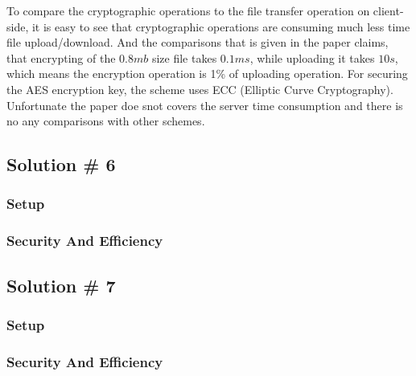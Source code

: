 \documentclass[12pt]{article}
\begin{document}
To compare the cryptographic operations to the file transfer operation on client-side, it is easy to see that cryptographic operations are consuming much less time file upload/download. And the comparisons that is given in the paper \cite{CovergentEnc} claims, that encrypting of the  $0.8 mb$  size file takes $0.1ms$, while uploading it takes $10s$, which means the encryption operation is 1\% of uploading operation. For securing the AES encryption key, the scheme uses ECC (Elliptic Curve Cryptography).\cite{ECC}  Unfortunate the paper\cite{CovergentEnc} doe snot covers the server time consumption and there is no any comparisons with other schemes. 


\subsection{Solution \# 6}
\label{sub:Soltuion6}

\subsubsection{Setup}
\label{subsub:setup6}

\subsubsection{Security And Efficiency}
\label{subsub:secAndeff6}


\subsection{Solution \# 7}
\label{sub:Soltuion7}

\subsubsection{Setup}
\label{subsub:setup7}

\subsubsection{Security And Efficiency}
\label{subsub:secAndeff7}
\end{document}

